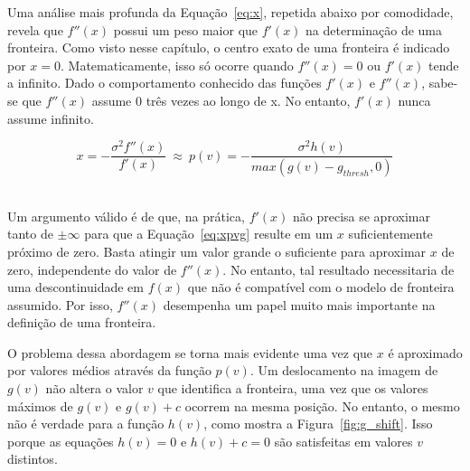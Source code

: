     Uma análise mais profunda da Equação~\eqref{eq:x}, repetida abaixo por comodidade, revela que $ f''(x) $ possui um peso maior que $ f'(x) $ na determinação de uma fronteira. Como visto nesse capítulo, o centro exato de uma fronteira é indicado por $ x = 0 $. Matematicamente, isso só ocorre quando $ f''(x) = 0 $ ou $ f'(x) $ tende a infinito. Dado o comportamento conhecido das funções $ f'(x) $ e $ f''(x) $, sabe-se que $ f''(x) $ assume $ 0 $ três vezes ao longo de x. No entanto, $ f'(x) $ nunca assume infinito.
    
\begin{equation} \label{eq:xpvg}
	x = -\frac{\sigma^{2}f''(x)}{f'(x)} \ \approx \ 
	p(v) = -\frac{\sigma^{2}h(v)}{max(g(v) - g_{thresh}, 0)}
\end{equation} \

	Um argumento válido é de que, na prática, $ f'(x) $ não precisa se aproximar tanto de $ \pm \infty $ para que a Equação~\eqref{eq:xpvg} resulte em um $ x $ suficientemente próximo de zero. Basta atingir um valor grande o suficiente para aproximar $ x $ de zero, independente do valor de $ f''(x) $. No entanto, tal resultado necessitaria de uma descontinuidade em $ f(x) $ que não é compatível com o modelo de fronteira assumido. Por isso, $ f''(x) $ desempenha um papel muito mais importante na definição de uma fronteira.
	
	O problema dessa abordagem se torna mais evidente uma vez que $ x $ é aproximado por valores médios através da função $ p(v) $. Um deslocamento na imagem de $ g(v) $ não altera o valor $ v $ que identifica a fronteira, uma vez que os valores máximos de $ g(v) $ e $ g(v) + c $ ocorrem na mesma posição. No entanto, o mesmo não é verdade para a função $ h(v) $, como mostra a Figura~\ref{fig:g_shift}. Isso porque as equações $ h(v) = 0 $ e $ h(v) + c = 0 $ são satisfeitas em valores $ v $ distintos.
	
